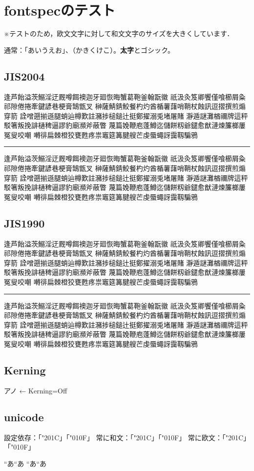 \documentclass{article}
\begin{document}
\section{fontspecのテスト}

※テストのため，欧文文字に対して和文文字のサイズを大きくしています．

\noindent 通常：「あいうえお」、（かきくけこ）。{\bf 太字}と{\gt ゴシック}。



\def\R{%
逢芦飴溢茨鰯淫迂厩噂餌襖迦牙廻恢晦蟹葛鞄釜翰翫徽
祇汲灸笈卿饗僅喰櫛屑粂祁隙倦捲牽鍵諺巷梗膏鵠甑叉
榊薩鯖錆鮫餐杓灼酋楯薯藷哨鞘杖蝕訊逗摺撰煎煽穿箭
詮噌遡揃遜腿蛸辿樽歎註瀦捗槌鎚辻挺鄭擢溺兎堵屠賭
瀞遁謎灘楢禰牌這秤駁箸叛挽誹樋稗逼謬豹廟瀕斧蔽瞥
蔑篇娩鞭庖蓬鱒迄儲餅籾爺鑓愈猷漣煉簾榔屢冤叟咬嘲
囀徘扁棘橙狡甕甦疼祟竈筵篝腱艘芒虔蜃蠅訝靄靱騙鴉
}

\subsection{JIS2004}
\R

\medskip\hrule\medskip
\vbox{\zw\tate{}\zw\R}



\subsection{JIS1990}
{\ipajisninety
\R

\medskip\hrule\medskip
\vbox{\zw\tate{}\zw\R}}

\subsection{Kerning}
{
アノ ← Kerning=Off

\par}

\subsection{unicode}

設定依存：「\char"201C」「\char"010F」%
常に和文：「\ltjjachar"201C」「\ltjjachar"010F」%
常に欧文：「\ltjalchar"201C」「\ltjalchar"010F」%

{\let\char=\ltjalchar\textquotedblleft}あ\textquotedblleft あ%
{\let\char=\ltjjachar\textquotedblleft}あ“あ
\end{document}
